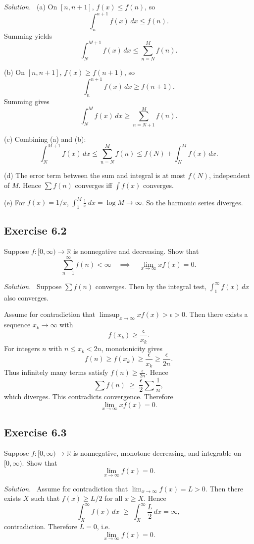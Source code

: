 \documentclass[11pt,a4paper]{article}
\newenvironment{solution}{\par\noindent\textit{Solution.}\ }{\par\vspace{0.5em}}
\begin{document}
\begin{solution}
	(a) On $[n,n+1]$, $f(x)\leq f(n)$, so
	\[
	\int_n^{n+1} f(x)\,dx \leq f(n).
	\]
	Summing yields
	\[
	\int_N^{M+1} f(x)\,dx \leq \sum_{n=N}^M f(n).
	\]
	
	(b) On $[n,n+1]$, $f(x)\geq f(n+1)$, so
	\[
	\int_n^{n+1} f(x)\,dx \geq f(n+1).
	\]
	Summing gives
	\[
	\int_N^M f(x)\,dx \geq \sum_{n=N+1}^M f(n).
	\]
	
	(c) Combining (a) and (b):
	\[
	\int_N^{M+1} f(x)\,dx \leq \sum_{n=N}^M f(n) \leq f(N)+\int_N^M f(x)\,dx.
	\]
	
	(d) The error term between the sum and integral is at most $f(N)$, independent of $M$. 
	Hence $\sum f(n)$ converges iff $\int f(x)$ converges.
	
	(e) For $f(x)=1/x$, $\int_1^M \frac{1}{x}\,dx=\log M\to\infty$. 
	So the harmonic series diverges.
\end{solution}


\subsection*{Exercise 6.2}
Suppose $f:[0,\infty)\to\mathbb{R}$ is nonnegative and decreasing. 
Show that
\[
\sum_{n=1}^\infty f(n)<\infty \quad\implies\quad \lim_{x\to\infty} x f(x)=0.
\]

\begin{solution}
	Suppose $\sum f(n)$ converges. Then by the integral test, $\int_1^\infty f(x)\,dx$ 
	also converges.
	
	Assume for contradiction that $\limsup_{x\to\infty} xf(x)>\epsilon>0$. Then there 
	exists a sequence $x_k\to\infty$ with
	\[
	f(x_k)\geq \frac{\epsilon}{x_k}.
	\]
	For integers $n$ with $n\leq x_k<2n$, monotonicity gives
	\[
	f(n)\geq f(x_k)\geq \frac{\epsilon}{x_k}\geq \frac{\epsilon}{2n}.
	\]
	Thus infinitely many terms satisfy $f(n)\geq \tfrac{\epsilon}{2n}$. Hence
	\[
	\sum f(n)\;\geq\;\frac{\epsilon}{2}\sum\frac{1}{n},
	\]
	which diverges. This contradicts convergence. Therefore
	\[
	\lim_{x\to\infty} x f(x)=0.
	\]
\end{solution}


\subsection*{Exercise 6.3}
Suppose $f:[0,\infty)\to\mathbb{R}$ is nonnegative, monotone decreasing, and 
integrable on $[0,\infty)$. Show that
\[
\lim_{x\to\infty} f(x)=0.
\]

\begin{solution}
	Assume for contradiction that $\lim_{x\to\infty} f(x)=L>0$. Then there exists 
	$X$ such that $f(x)\geq L/2$ for all $x\geq X$. Hence
	\[
	\int_X^\infty f(x)\,dx \;\geq\;\int_X^\infty \frac{L}{2}\,dx = \infty,
	\]
	contradiction. Therefore $L=0$, i.e.
	\[
	\lim_{x\to\infty} f(x)=0.
	\]
\end{solution}
\end{document}
